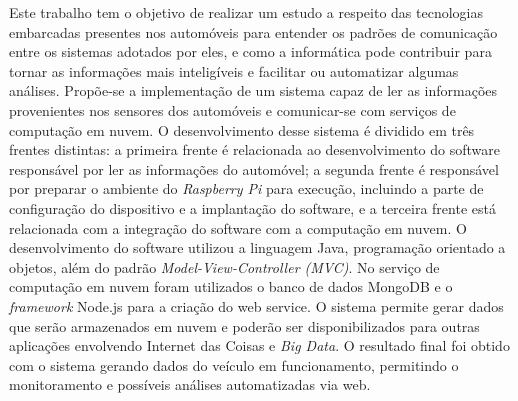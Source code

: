 
\setlength{\absparsep}{18pt}
\begin{resumo}

\hspace{1.5cm}
Este trabalho tem o objetivo de realizar um estudo a respeito das tecnologias embarcadas presentes nos automóveis para entender os padrões de comunicação entre os sistemas adotados por eles, e como a informática pode contribuir para tornar as informações mais inteligíveis e facilitar ou automatizar algumas análises. Propõe-se a implementação de um sistema capaz de ler as informações provenientes nos sensores dos automóveis e comunicar-se com serviços de computação em nuvem. O desenvolvimento desse sistema é dividido em três frentes distintas: a primeira frente é relacionada ao desenvolvimento do software responsável por ler as informações do automóvel; a segunda frente é responsável por preparar o ambiente do \textit{Raspberry Pi} para execução, incluindo a parte de configuração do dispositivo e a implantação do software, e a terceira frente está relacionada com a integração do software com a computação em nuvem. O desenvolvimento do software utilizou a linguagem Java, programação orientado a objetos, além do padrão \textit{Model-View-Controller (MVC)}. No serviço de computação em nuvem foram utilizados o banco de dados MongoDB e o \textit{framework} Node.js para a criação do web service. O sistema permite gerar dados que serão armazenados em nuvem e poderão ser disponibilizados para outras aplicações envolvendo Internet das Coisas e \textit{Big Data}. O resultado final foi obtido com o sistema gerando dados do veículo em funcionamento, permitindo o monitoramento e possíveis análises automatizadas via web.

\vspace{1cm}


\end{resumo}
